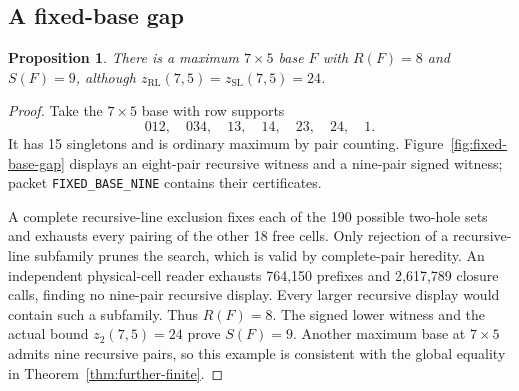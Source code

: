 \documentclass[11pt,a4paper]{article}
\newtheorem{proposition}[theorem]{Proposition}
\theoremstyle{definition}
\newcommand{\zr}{z_{\mathrm{RL}}}
\newcommand{\zs}{z_{\mathrm{SL}}}
\newcommand{\zt}{z_2}
\begin{document}
\subsection{A fixed-base gap}\label{sec:fixed-gap}
\begin{proposition}\label{prop:fixed-base-gap}
There is a maximum $7\times5$ base $F$ with $R(F)=8$ and $S(F)=9$,
although $\zr(7,5)=\zs(7,5)=24$.
\end{proposition}
\begin{proof}
Take the $7\times5$ base with row supports
\[
 012,\quad034,\quad13,\quad14,\quad23,\quad24,\quad1.
\]
It has 15 singletons and is ordinary maximum by pair counting.
Figure~\ref{fig:fixed-base-gap} displays an eight-pair recursive witness
and a nine-pair signed witness; packet \texttt{FIXED\_BASE\_NINE} contains their certificates.

 A complete recursive-line exclusion fixes each of the 190
possible two-hole sets and exhausts every pairing of the other 18 free
cells. Only rejection of a recursive-line subfamily prunes the search,
which is valid by complete-pair heredity. An independent physical-cell
reader exhausts 764,150 prefixes and 2,617,789 closure calls, finding
no nine-pair recursive display. Every larger recursive display would
contain such a subfamily. Thus $R(F)=8$. The signed lower witness and
the actual bound $\zt(7,5)=24$ prove $S(F)=9$.
Another maximum base at $7\times5$ admits nine recursive pairs, so
this example is consistent with the global equality in
Theorem~\ref{thm:further-finite}.

\end{proof}
\end{document}
